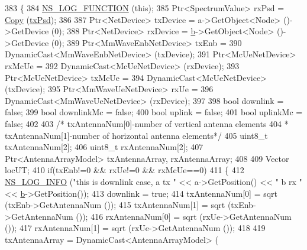 \begin{DoxyCode}
383 \{
384         \hyperlink{log-macros-disabled_8h_a90b90d5bad1f39cb1b64923ea94c0761}{NS\_LOG\_FUNCTION} (\textcolor{keyword}{this});
385         Ptr<SpectrumValue> rxPsd = \hyperlink{namespacens3_a952d99f6d759fee74dda19f308451bc1}{Copy} (\hyperlink{lte__link__budget_8m_a684fe3101a5e48a5fcc57cab8dbcd1aa}{txPsd});
386 
387         Ptr<NetDevice> txDevice = a->GetObject<Node> ()->GetDevice (0);
388         Ptr<NetDevice> rxDevice = \hyperlink{buildings__pathloss_8m_a21ad0bd836b90d08f4cf640b4c298e7c}{b}->GetObject<Node> ()->GetDevice (0);
389         Ptr<MmWaveEnbNetDevice> txEnb =
390                                         DynamicCast<MmWaveEnbNetDevice> (txDevice);
391         Ptr<McUeNetDevice> rxMcUe =
392                                         DynamicCast<McUeNetDevice> (rxDevice);
393         Ptr<McUeNetDevice> txMcUe =
394                                         DynamicCast<McUeNetDevice> (txDevice);
395         Ptr<MmWaveUeNetDevice> rxUe =
396                                         DynamicCast<MmWaveUeNetDevice> (rxDevice);
397 
398         \textcolor{keywordtype}{bool} downlink = \textcolor{keyword}{false};
399         \textcolor{keywordtype}{bool} downlinkMc = \textcolor{keyword}{false};
400         \textcolor{keywordtype}{bool} uplink = \textcolor{keyword}{false};
401         \textcolor{keywordtype}{bool} uplinkMc = \textcolor{keyword}{false};
402 
403         \textcolor{comment}{/* txAntennaNum[0]-number of vertical antenna elements}
404 \textcolor{comment}{         * txAntennaNum[1]-number of horizontal antenna elements*/}
405         uint8\_t txAntennaNum[2];
406         uint8\_t rxAntennaNum[2];
407         Ptr<AntennaArrayModel> txAntennaArray, rxAntennaArray;
408 
409         Vector locUT;
410         \textcolor{keywordflow}{if}(txEnb!=0 && rxUe!=0 && rxMcUe==0)
411         \{
412                 \hyperlink{group__logging_gafbd73ee2cf9f26b319f49086d8e860fb}{NS\_LOG\_INFO} (\textcolor{stringliteral}{"this is downlink case, a tx "} << a->GetPosition() << \textcolor{stringliteral}{" b rx "} << 
      \hyperlink{buildings__pathloss_8m_a21ad0bd836b90d08f4cf640b4c298e7c}{b}->GetPosition());
413                 downlink = \textcolor{keyword}{true};
414                 txAntennaNum[0] = sqrt (txEnb->GetAntennaNum ());
415                 txAntennaNum[1] = sqrt (txEnb->GetAntennaNum ());
416                 rxAntennaNum[0] = sqrt (rxUe->GetAntennaNum ());
417                 rxAntennaNum[1] = sqrt (rxUe->GetAntennaNum ());
418 
419                 txAntennaArray = DynamicCast<AntennaArrayModel> (

\end{DoxyCode}
